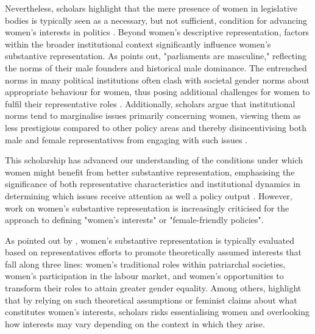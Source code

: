 Nevertheless, scholars highlight that the mere presence of women in legislative bodies is typically seen as a necessary, but not sufficient, condition for advancing women's interests in politics \parencite{lovenduski_feminizing_2002,clayton_quotas_2017,franceschet_gender_2008}. Beyond women's descriptive representation, factors within the broader institutional context significantly influence women's substantive representation. As \textcite[208]{lovenduski_feminizing_2002} points out, "parliaments are masculine," reflecting the norms of their male founders and historical male dominance. The entrenched norms in many political institutions often clash with societal gender norms about appropriate behaviour for women, thus posing additional challenges for women to fulfil their representative roles \parencite{lovenduski_feminizing_2002, vallejo_vera_politics_2022, franceschet_gender_2008}. Additionally, scholars argue that institutional norms tend to marginalise issues primarily concerning women, viewing them as less prestigious compared to other policy areas and thereby disincentivising both male and female representatives from engaging with such issues \parencite{whip_representing_1991, escobar-lemmon_women_2005,franceschet_themes_2012}.

This scholarship has advanced our understanding of the conditions under which women might benefit from better substantive representation, emphasising the significance of both representative characteristics and institutional dynamics in determining which issues receive attention \parencite[e.g.,][]{clayton_quota_2018} as well a policy output \parencite[e.g.,][]{bratton_descriptive_2002, bolzendahl_womens_2007}. However, work on women's substantive representation is increasingly criticised for the approach to defining "women's interests" or "female-friendly policies".

As pointed out by \textcite[153]{celis_constituting_2014}, women's substantive representation is typically evaluated based on representatives efforts to promote theoretically assumed interests that fall along three lines: women's traditional roles within patriarchal societies, women's participation in the labour market, and women's opportunities to transform their roles to attain greater gender equality. 
Among others, \textcite{celis_constituting_2014, yildirim_rethinking_2022} highlight that by relying on such theoretical assumptions \parencite[e.g.,][]{bratton_descriptive_2002, bolzendahl_womens_2007, brooks_social_2006} or feminist claims \parencite[e.g.,][]{clayton_quotas_2017} about what constitutes women's interests, scholars risks essentialising women and overlooking how interests may vary depending on the context in which they arise. 


